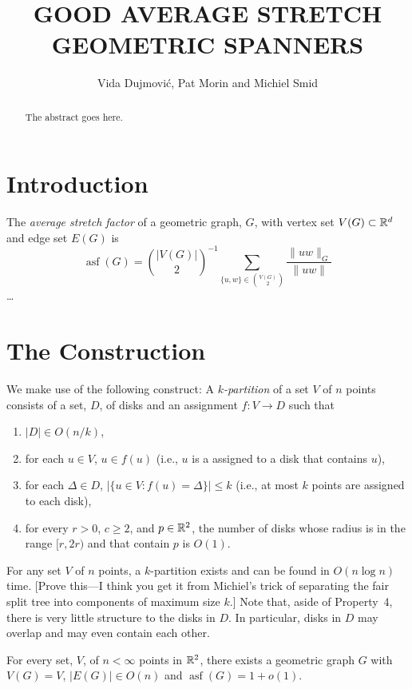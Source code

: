 \documentclass{patmorin}
\title{\MakeUppercase{Good Average Stretch Geometric Spanners}}
\author{Vida Dujmovi\'c, Pat Morin and Michiel Smid}
\DeclareMathOperator{\asf}{asf}
\begin{document}
\begin{titlepage}
\maketitle

\begin{abstract}
  The abstract goes here.
\end{abstract}

\end{titlepage}

\section{Introduction}

The \emph{average stretch factor} of a geometric graph, $G$, with vertex
set $V(G)\subset \mathbb{R}^d$ and edge set $E(G)$ is
\[
    \asf(G) = \binom{|V(G)|}{2}^{-1}\sum_{\{u,w\}\in\binom{V(G)}{2}}\frac{\|uw\|_G}{\|uw\|}
\]
\ldots

\section{The Construction}

We make use of the following construct:  A \emph{$k$-partition} of a
set $V$ of $n$ points consists of a set, $D$,
of disks and an assignment $f:V\to D$ such that
\begin{enumerate}
  \item $|D|\in O(n/k)$,
  \item for each $u\in V$, $u\in f(u)$ (i.e., $u$ is a assigned to a
    disk that contains $u$),
  \item for each $\Delta\in D$, $|\{u\in V: f(u)=\Delta\}|\le k$ (i.e.,
   at most $k$ points are assigned to each disk),
  \item for every $r> 0$, $c\ge 2$, and $p\in\mathbb{R}^2$, the number of disks
   whose radius is in the range $[r,2r)$ and that contain $p$ is $O(1)$.
\end{enumerate}
For any set $V$ of $n$ points, a $k$-partition exists and can be found in
$O(n\log n)$ time. [Prove this---I think you get it from Michiel's trick
of separating the fair split tree into components of maximum size $k$.]
Note that, aside of Property~4, there is very little structure to
the disks in $D$. In particular, disks in $D$ may overlap and may
even contain each other.

\begin{thm}
  For every set, $V$, of $n<\infty$ points in $\mathbb{R}^2$, there exists a
  geometric graph $G$ with $V(G)=V$, $|E(G)|\in O(n)$ and $\asf(G)=1+o(1)$.
\end{thm}
\end{document}
